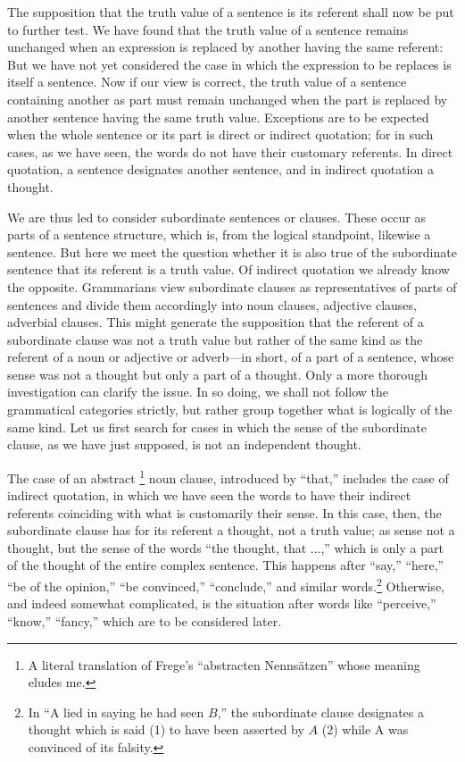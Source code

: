 \documentclass[twoside,12pt,a4paper]{article}
\newcommand{\footnoteAlph}[2][\thefootnote]{%
  \renewcommand{\thefootnote}{\Alph{footnote}}%
  \footnote[#1]{#2}%
  \renewcommand{\thefootnote}{\arabic{footnote}}}
\begin{document}
The supposition that the truth value of a sentence is its referent
shall now be put to further test. We have found that the truth value
of a sentence remains unchanged when an expression is replaced by
another having the same referent: But we have not yet considered the
case in which the expression to be replaces is itself a sentence. Now
if our view is correct, the truth value of a sentence containing
another as part must remain unchanged when the part is replaced by
another sentence having the same truth value. Exceptions are to be
expected when the whole sentence or its part is direct or indirect
quotation; for in such cases, as we have seen, the words do not have
their customary referents. In direct quotation, a sentence designates
another sentence, and in indirect quotation a thought.

We are thus led to consider subordinate sentences or clauses. These
occur as parts of a sentence structure, which is, from the logical
standpoint, likewise a sentence. But here we meet the question whether
it is also true of the subordinate sentence that its referent is a
truth value. Of indirect quotation we already know the opposite.
Grammarians view subordinate clauses as representatives of parts of
sentences and divide them accordingly into noun clauses, adjective
clauses, adverbial clauses. This might generate the supposition that
the referent of a subordinate clause was not a truth value but rather
of the same kind as the referent of a noun or adjective or adverb---in
short, of a part of a sentence, whose sense was not a thought but only
a part of a thought. Only a more thorough investigation can clarify
the issue. In so doing, we shall not follow the grammatical categories
strictly, but rather group together what is logically of the same
kind. Let us first search for cases in which the sense of the
subordinate clause, as we have just supposed, is not an independent
thought.

The case of an abstract\footnoteAlph[4]{A literal translation of
  Frege's ``abstracten Nenns\"atzen'' whose meaning eludes me.} noun
clause, introduced by ``that,'' includes the case of indirect
quotation, in which we have seen the words to have their indirect
referents coinciding with what is customarily their sense. In this
case, then, the subordinate clause has for its referent a thought, not
a truth value; as sense not a thought, but the sense of the words
``the thought, that ...,'' which is only a part of the thought of the
entire complex sentence. This happens after ``say,'' ``here,'' ``be of
the opinion,'' ``be convinced,'' ``conclude,'' and similar
words.\footnote[8]{In ``A lied in saying he had seen $B$,'' the
  subordinate clause designates a thought which is said (1) to have
  been asserted by $A$ (2) while A was convinced of its falsity.}
Otherwise, and indeed somewhat complicated, is the situation after
words like ``perceive,'' ``know,'' ``fancy,'' which are to be
considered later.
\end{document}
